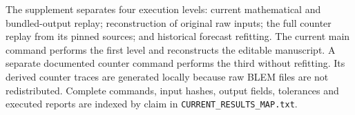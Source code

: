 The supplement separates four execution levels: current mathematical and
bundled-output replay; reconstruction of original raw inputs; the full
counter replay from its pinned sources; and historical forecast refitting.
The current main command performs the first level and reconstructs the
editable manuscript. A separate documented counter command performs the
third without refitting. Its derived counter traces are generated locally
because raw BLEM files are not redistributed. Complete commands, input
hashes, output fields, tolerances and executed reports are indexed by claim
in \texttt{CURRENT\_RESULTS\_MAP.txt}.

